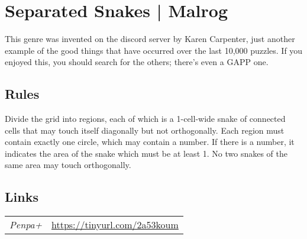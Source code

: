 \section[Separated Snakes | Malrog {[\emph{Separated Snakes}]}]{Separated Snakes | {\normalfont Malrog}}
\label{sec:41-separated-snakes-malrog}
This genre was invented on the discord server by Karen Carpenter, just another example of the good things that have occurred over the last 10,000 puzzles. If you enjoyed this, you should search for the others; there's even a GAPP one.
\subsection*{Rules}
\begin{markdown}
Divide the grid into regions, each of which is a 1-cell-wide snake of connected cells that may touch itself diagonally but not orthogonally. Each region must contain exactly one circle, which may contain a number. If there is a number, it indicates the area of the snake which must be at least 1. No two snakes of the same area may touch orthogonally.
\end{markdown}
\subsection*{Links}
\begin{tabularx}{\textwidth}{l X}
\emph{Penpa+} & \url{https://tinyurl.com/2a53koum} \\
\end{tabularx}
\pagebreak
